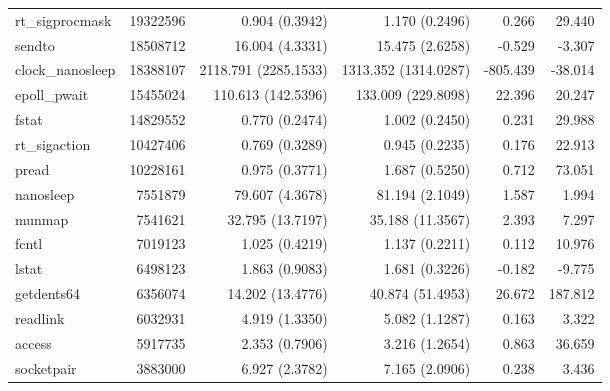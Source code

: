 \begin{longtable}{>{\ttfamily}lrrrrr}
                rt\_sigprocmask &    19322596 &           0.904 (0.3942) &           1.170 (0.2496) &           0.266 &       29.440 \\
                         sendto &    18508712 &          16.004 (4.3331) &          15.475 (2.6258) &          -0.529 &       -3.307 \\
               clock\_nanosleep &    18388107 &     2118.791 (2285.1533) &     1313.352 (1314.0287) &        -805.439 &      -38.014 \\
                   epoll\_pwait &    15455024 &       110.613 (142.5396) &       133.009 (229.8098) &          22.396 &       20.247 \\
                          fstat &    14829552 &           0.770 (0.2474) &           1.002 (0.2450) &           0.231 &       29.988 \\
                  rt\_sigaction &    10427406 &           0.769 (0.3289) &           0.945 (0.2235) &           0.176 &       22.913 \\
                          pread &    10228161 &           0.975 (0.3771) &           1.687 (0.5250) &           0.712 &       73.051 \\
                      nanosleep &     7551879 &          79.607 (4.3678) &          81.194 (2.1049) &           1.587 &        1.994 \\
                         munmap &     7541621 &         32.795 (13.7197) &         35.188 (11.3567) &           2.393 &        7.297 \\
                          fcntl &     7019123 &           1.025 (0.4219) &           1.137 (0.2211) &           0.112 &       10.976 \\
                          lstat &     6498123 &           1.863 (0.9083) &           1.681 (0.3226) &          -0.182 &       -9.775 \\
                     getdents64 &     6356074 &         14.202 (13.4776) &         40.874 (51.4953) &          26.672 &      187.812 \\
                       readlink &     6032931 &           4.919 (1.3350) &           5.082 (1.1287) &           0.163 &        3.322 \\
                         access &     5917735 &           2.353 (0.7906) &           3.216 (1.2654) &           0.863 &       36.659 \\
                     socketpair &     3883000 &           6.927 (2.3782) &           7.165 (2.0906) &           0.238 &        3.436 \\

\end{longtable}
